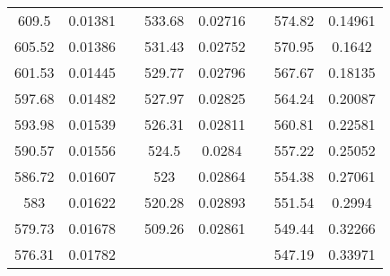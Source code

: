 \documentclass[letterpaper,12pt]{article}
\begin{document}
\begin{table}[!h]
\begin{tabular}{cccccccc}
\rowcolor[HTML]{EFEFEF} 
609.5                    & 0.01381                &                          & 533.68                   & 0.02716                &                          & 574.82                  & 0.14961                  \\
\rowcolor[HTML]{EFEFEF} 
605.52                   & 0.01386                &                          & 531.43                   & 0.02752                &                          & 570.95                  & 0.1642                   \\
\rowcolor[HTML]{EFEFEF} 
601.53                   & 0.01445                &                          & 529.77                   & 0.02796                &                          & 567.67                  & 0.18135                  \\
\rowcolor[HTML]{EFEFEF} 
597.68                   & 0.01482                &                          & 527.97                   & 0.02825                &                          & 564.24                  & 0.20087                  \\
\rowcolor[HTML]{EFEFEF} 
593.98                   & 0.01539                &                          & 526.31                   & 0.02811                &                          & 560.81                  & 0.22581                  \\
\rowcolor[HTML]{EFEFEF} 
590.57                   & 0.01556                &                          & 524.5                    & 0.0284                 &                          & 557.22                  & 0.25052                  \\
\rowcolor[HTML]{EFEFEF} 
586.72                   & 0.01607                &                          & 523                      & 0.02864                &                          & 554.38                  & 0.27061                  \\
\rowcolor[HTML]{EFEFEF} 
583                      & 0.01622                &                          & 520.28                   & 0.02893                &                          & 551.54                  & 0.2994                   \\
\rowcolor[HTML]{EFEFEF} 
579.73                   & 0.01678                &                          & 509.26                   & 0.02861                &                          & 549.44                  & 0.32266                  \\
\rowcolor[HTML]{EFEFEF} 
576.31                   & 0.01782                &                          &                          &                        &                          & 547.19                  & 0.33971                  \\

\end{tabular}
\end{table}
\end{document}
